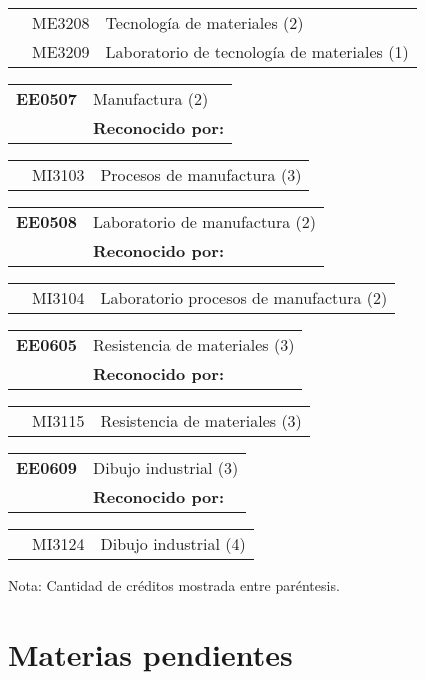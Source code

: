 \documentclass[letterpaper]{article}%
\begin{document}
\begin{tabularx}{\textwidth}{p{1.5cm}p{1.5cm}p{10cm}}%
&ME3208&Tecnología de materiales (2)\\%
&ME3209&Laboratorio de tecnología de materiales (1)\\%
\end{tabularx}%
\begin{tabularx}{\textwidth}{p{1.5cm}p{10cm}}%
\textbf{EE0507}&Manufactura (2)\\%
&\textbf{Reconocido por: }\\%
\end{tabularx}%
\begin{tabularx}{\textwidth}{p{1.5cm}p{1.5cm}p{10cm}}%
&MI3103&Procesos de manufactura (3)\\%
\end{tabularx}%
\begin{tabularx}{\textwidth}{p{1.5cm}p{10cm}}%
\textbf{EE0508}&Laboratorio de manufactura (2)\\%
&\textbf{Reconocido por: }\\%
\end{tabularx}%
\begin{tabularx}{\textwidth}{p{1.5cm}p{1.5cm}p{10cm}}%
&MI3104&Laboratorio procesos de manufactura (2)\\%
\end{tabularx}%
\begin{tabularx}{\textwidth}{p{1.5cm}p{10cm}}%
\textbf{EE0605}&Resistencia de materiales (3)\\%
&\textbf{Reconocido por: }\\%
\end{tabularx}%
\begin{tabularx}{\textwidth}{p{1.5cm}p{1.5cm}p{10cm}}%
&MI3115&Resistencia de materiales (3)\\%
\end{tabularx}%
\begin{tabularx}{\textwidth}{p{1.5cm}p{10cm}}%
\textbf{EE0609}&Dibujo industrial (3)\\%
&\textbf{Reconocido por: }\\%
\end{tabularx}%
\begin{tabularx}{\textwidth}{p{1.5cm}p{1.5cm}p{10cm}}%
&MI3124&Dibujo industrial (4)\\%
\end{tabularx}%
Nota: Cantidad de créditos mostrada entre paréntesis.

%
\section*{Materias pendientes}%
\label{sec:Materiaspendientes}%
\end{document}

